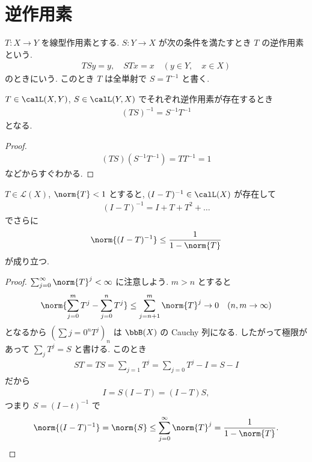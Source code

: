 \documentclass[openany, a4paper, oneside]{jsbook}
\begin{document}
\section{逆作用素}

\begin{defn}
$T \colon X \to Y$ を線型作用素とする.
$S \colon Y \to X$ が次の条件を満たすとき $T$ の逆作用素という.
\begin{align}
 TSy
 =
 y, \quad
 STx
 =
 x \quad (y \in Y, \quad x \in X)
\end{align}
のときにいう.
このとき $T$ は全単射で $S = T^{-1}$ と書く.
\end{defn}

\begin{prop}
$T \in \calL (X, Y)$, $S \in \calL (Y, X)$
でそれぞれ逆作用素が存在するとき
\begin{align}
 (TS)^{-1}
 =
 S^{-1}T^{-1}
\end{align}
となる.
\end{prop}
\begin{proof}
\begin{align}
 (TS)(S^{-1}T^{-1})
 =
 TT^{-1}
 =
 1
\end{align}
などからすぐわかる.
\end{proof}

\begin{thm}[C. Neumann 級数]
$T \in \mathcal{L}(X)$, $\norm{T} < 1$ とすると,
$(I - T)^{-1} \in \calL (X)$ が存在して
\begin{align}
 (I-T)^{-1}
 =
 I + T + T^2 + \dots
\end{align}
でさらに
\begin{align}
 \norm{(I-T)^{-1}}
 \leq
 \frac{1}{1 - \norm{T}}
\end{align}
が成り立つ.
\end{thm}
\begin{proof}
$\sum_{j=0}^{\infty} \norm{T}^j < \infty$ に注意しよう.
$m>n$ とすると
\begin{align}
 \norm{\sum_{j=0}^m T^j - \sum_{j=0}^n T^j}
 \leq
 \sum_{j=n+1}^m \norm{T}^j \to 0
 \quad (n, m \to \infty)
\end{align}
となるから $(\sum{j=0}^nT^j)_n$ は $\bbB (X)$ の Cauchy 列になる.
したがって極限があって $\sum_j T^j = S$ と書ける.
このとき
\begin{align}
 ST
 =
 TS
 =
 \sum_{j=1} T^j
 =
 \sum_{j=0}T^j - I
 = S - I
\end{align}
だから
\begin{align}
 I
 =
 S(I - T)
 = (I - T)S,
\end{align}
つまり $S = (I-t)^{-1}$ で
\begin{align}
 \norm{(I-T)^{-1}}
 =
 \norm{S}
 \leq
 \sum_{j=0}^{\infty} \norm{T}^j
 =
 \frac{1}{1- \norm{T}}.
\end{align}
\end{proof}
\end{document}
